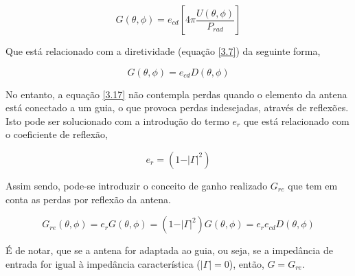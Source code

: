 \begin{equation} \label{3.16}
G\left( \theta ,\phi\right)=e_{cd} \left[ 4\pi \dfrac{U\left( \theta ,\phi\right)}{P_{rad}}\right] 
\end{equation}

Que está relacionado com a diretividade (equação \ref{3.7}) da seguinte forma,

\begin{equation} \label{3.17}
G\left( \theta ,\phi\right)=e_{cd}D\left( \theta ,\phi\right)
\end{equation}

No entanto, a equação \ref{3.17} não contempla perdas quando o elemento da antena está conectado a um guia, o que provoca perdas indesejadas, através de reflexões. Isto pode ser solucionado com a introdução do termo $e_{r}$ que está relacionado com o coeficiente de reflexão,

\begin{equation} \label{3.18}
e_{r}=\left( 1-\vert\Gamma\vert^{2}\right) 
\end{equation}

Assim sendo, pode-se introduzir o conceito de ganho realizado $G_{re}$ que tem em conta as perdas por reflexão da antena.

\begin{equation} \label{3.19}
G_{re}\left( \theta ,\phi\right)=e_{r}G\left( \theta ,\phi\right)=\left( 1-\vert\Gamma\vert^{2}\right)G\left( \theta ,\phi\right)=e_{r}e_{cd}D\left( \theta ,\phi\right) 
\end{equation}

É de notar, que se a antena for adaptada ao guia, ou seja, se a impedância de entrada for igual à impedância característica ($\vert\Gamma\vert =0$), então, $G=G_{re}$.


